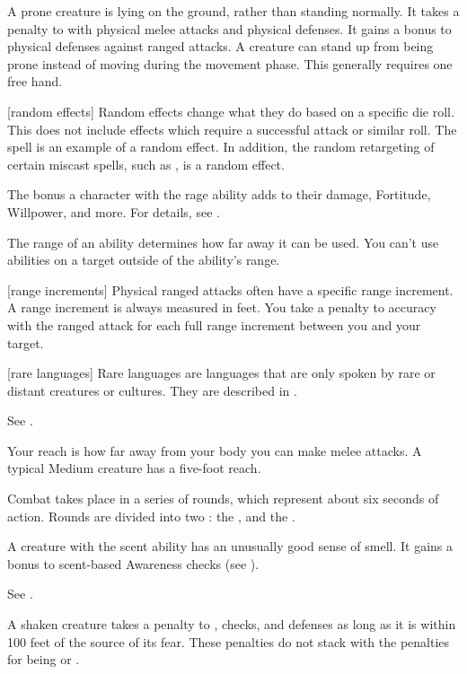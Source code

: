  A prone creature is lying on the ground, rather than standing normally.
It takes a  penalty to  with physical melee attacks and physical defenses.
It gains a  bonus to physical defenses against ranged attacks.
A creature can stand up from being prone instead of moving during the movement phase.
This generally requires one free hand.

[random effects] Random effects change what they do based on a specific die roll.
This does not include effects which require a successful attack or similar roll.
The  spell is an example of a random effect.
In addition, the random retargeting of certain miscast spells, such as , is a random effect.

 The bonus a character with the rage ability adds to their damage, Fortitude, Willpower, and more.
For details, see .

 The range of an ability determines how far away it can be used.
You can't use abilities on a target outside of the ability's range.

[range increments] Physical ranged attacks often have a specific range increment.
A range increment is always measured in feet.
You take a  penalty to accuracy with the ranged attack for each full range increment between you and your target.

[rare languages] Rare languages are languages that are only spoken by rare or distant creatures or cultures.
They are described in .

 See .

 Your reach is how far away from your body you can make melee attacks.
A typical Medium creature has a five-foot reach.

 Combat takes place in a series of rounds, which represent about six seconds of action.
Rounds are divided into two : the , and the .

 A creature with the scent ability has an unusually good sense of smell.
It gains a  bonus to scent-based Awareness checks (see ).

 See .

 A shaken creature takes a  penalty to , checks, and defenses as long as it is within 100 feet of the source of its fear.
These penalties do not stack with the penalties for being \frightened or \panicked.

